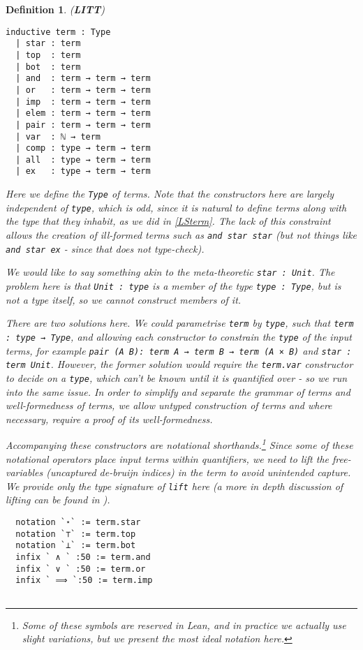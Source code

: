 \documentclass[12pt,leqno]{article}
\def\lc{\lstinline}
\theoremstyle{example}
\newtheorem{definition}[theorem]{Definition}
\numberwithin{equation}{section}
\begin{document}
\begin{definition}(\textbf{LITT})
  \begin{lstlisting}[frame=single]
  inductive term : Type
  | star : term
  | top  : term
  | bot  : term
  | and  : term → term → term
  | or   : term → term → term
  | imp  : term → term → term
  | elem : term → term → term
  | pair : term → term → term
  | var  : ℕ → term
  | comp : type → term → term
  | all  : type → term → term
  | ex   : type → term → term
  \end{lstlisting}

  Here we define the \lc{Type} of terms. Note that the constructors here are largely independent of \lc{type}, which is odd, since it is natural to define terms along with the type that they inhabit, as we did in \ref{LSterm}. The lack of this constraint allows the creation of ill-formed terms such as \lc{and star star} (but not things like \lc{and star ex} - since that does not type-check).

  We would like to say something akin to the meta-theoretic \lc{star : Unit}. The problem here is that \lc{Unit : type} is a member of the type \lc{type : Type}, but is not a type itself, so we cannot construct members of it.

  There are two solutions here. We could parametrise \lc{term} by \lc{type}, such that \lc{term : type → Type}, and allowing each constructor to constrain the \lc{type} of the input terms, for example \lc{pair (A B): term A → term B → term (A × B)} and \lc{star : term Unit}. However, the former solution would require the \lc{term.var} constructor to decide on a \lc{type}, which can't be known until it is quantified over - so we run into the same issue. In order to simplify and separate the \emph{grammar} of terms and \emph{well-formedness} of terms, we allow untyped construction of terms and where necessary, require a proof of its well-formedness.

  Accompanying these constructors are notational shorthands.\footnote{Some of these symbols are reserved in Lean, and in practice we actually use slight variations, but we present the most ideal notation here.} Since some of these notational operators place input terms within quantifiers, we need to \emph{lift} the free-variables (uncaptured de-bruijn indices) in the term to avoid unintended capture. We provide only the type signature of \lc{lift} here (a more in depth discussion of lifting can be found in \cite{pierce}
  ). 
  \begin{lstlisting}
  notation `⋆` := term.star
  notation `⊤` := term.top
  notation `⊥` := term.bot
  infix ` ∧ ` :50 := term.and
  infix ` ∨ ` :50 := term.or
  infix ` ⟹ `:50 := term.imp


\end{lstlisting}
\end{definition}
\end{document}
